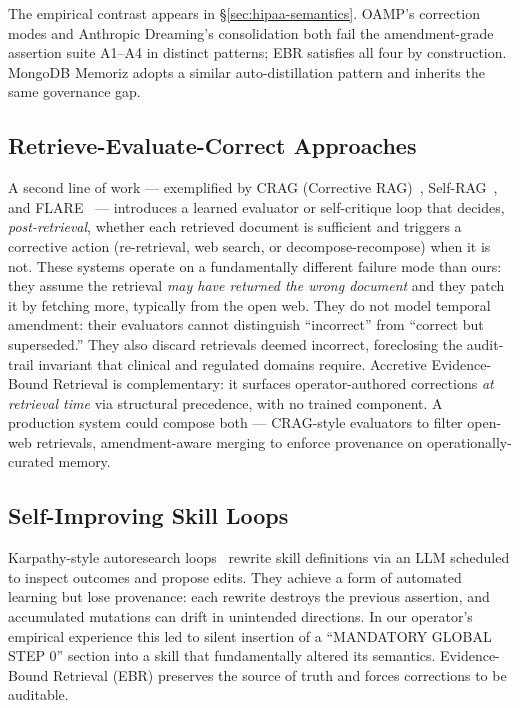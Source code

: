 \documentclass[runningheads]{llncs}
\begin{document}
The empirical contrast appears in \S\ref{sec:hipaa-semantics}. OAMP's
correction modes and Anthropic Dreaming's consolidation both fail the
amendment-grade assertion suite A1--A4 in distinct patterns; EBR satisfies
all four by construction. MongoDB Memoriz adopts a similar
auto-distillation pattern and inherits the same governance gap.

\subsection{Retrieve-Evaluate-Correct Approaches}

A second line of work --- exemplified by CRAG (Corrective
RAG)~\cite{yan2024crag}, Self-RAG~\cite{asai2023selfrag}, and
FLARE~\cite{jiang2023flare} --- introduces a learned evaluator or
self-critique loop that decides, \emph{post-retrieval}, whether each retrieved
document is sufficient and triggers a corrective action (re-retrieval, web
search, or decompose-recompose) when it is not. These systems operate on a
fundamentally different failure mode than ours: they assume the retrieval
\emph{may have returned the wrong document} and they patch it by fetching
more, typically from the open web. They do not model temporal amendment:
their evaluators cannot distinguish ``incorrect'' from ``correct but
superseded.'' They also discard retrievals deemed incorrect, foreclosing the
audit-trail invariant that clinical and regulated domains require. Accretive
Evidence-Bound Retrieval is complementary: it surfaces operator-authored corrections
\emph{at retrieval time} via structural precedence, with no trained
component. A production system could compose both --- CRAG-style evaluators
to filter open-web retrievals, amendment-aware merging to enforce
provenance on operationally-curated memory.

\subsection{Self-Improving Skill Loops}

Karpathy-style autoresearch
loops~\cite{karpathy2024agentic} rewrite skill definitions via an LLM
scheduled to inspect outcomes and propose edits. They achieve a form of
automated learning but lose provenance: each rewrite destroys the previous
assertion, and accumulated mutations can drift in unintended directions. In
our operator's empirical experience this led to silent insertion of a
``MANDATORY GLOBAL STEP 0'' section into a skill that fundamentally altered
its semantics. Evidence-Bound Retrieval (EBR) preserves the source of truth and
forces corrections to be auditable.
\end{document}
